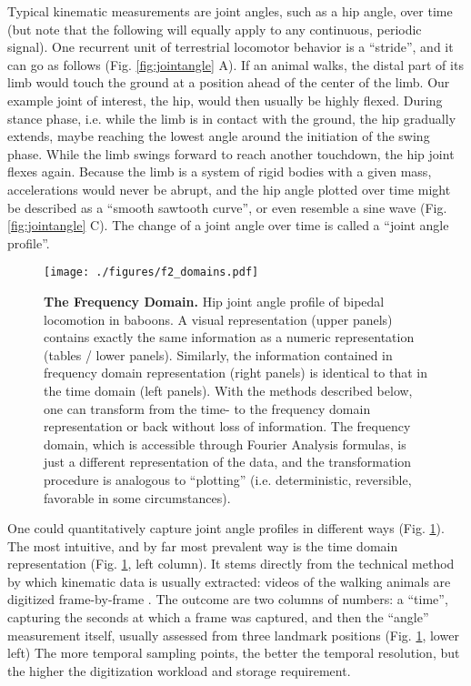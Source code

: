 \documentclass[10pt,a4paper]{article}
\begin{document}
Typical kinematic measurements are joint angles, such as a hip angle, over time (but note that the following will equally apply to any continuous, periodic signal).
One recurrent unit of terrestrial locomotor behavior is a ``stride'', and it can go as follows (Fig. \ref{fig:jointangle} A).
If an animal walks, the distal part of its limb would touch the ground at a position ahead of the center of the limb.
Our example joint of interest, the hip, would then usually be highly flexed.
During stance phase, i.e. while the limb is in contact with the ground, the hip gradually extends, maybe reaching the lowest angle around the initiation of the swing phase.
While the limb swings forward to reach another touchdown, the hip joint flexes again.
Because the limb is a system of rigid bodies with a given mass, accelerations would never be abrupt, and the hip angle plotted over time might be described as a ``smooth sawtooth curve'', or even resemble a sine wave (Fig. \ref{fig:jointangle} C).
The change of a joint angle over time is called a ``joint angle profile''.


\begin{figure}[pb]
\centering
\texttt{[image: ./figures/f2\_domains.pdf]}
\caption{\label{fig:domains}\textbf{The Frequency Domain.} Hip joint angle profile of bipedal locomotion in baboons. A visual representation (upper panels) contains exactly the same information as a numeric representation (tables / lower panels). Similarly, the information contained in frequency domain representation (right panels) is identical to that in the time domain (left panels). With the methods described below, one can transform from the time- to the frequency domain representation or back without loss of information. The frequency domain, which is accessible through Fourier Analysis formulas, is just a different representation of the data, and the transformation procedure is analogous to ``plotting'' (i.e. deterministic, reversible, favorable in some circumstances).}
\end{figure}


One could quantitatively capture joint angle profiles in different ways (Fig. \ref{fig:domains}).
The most intuitive, and by far most prevalent way is the time domain representation (Fig. \ref{fig:domains}, left column).
It stems directly from the technical method by which kinematic data is usually extracted: videos of the walking animals are digitized frame-by-frame \citep[\textit{cf.}][]{MMielke2020}.
The outcome are two columns of numbers: a ``time'', capturing the seconds at which a frame was captured, and then the ``angle'' measurement itself, usually assessed from three landmark positions (Fig. \ref{fig:domains}, lower left)
The more temporal sampling points, the better the temporal resolution, but the higher the digitization workload and storage requirement.
\end{document}
